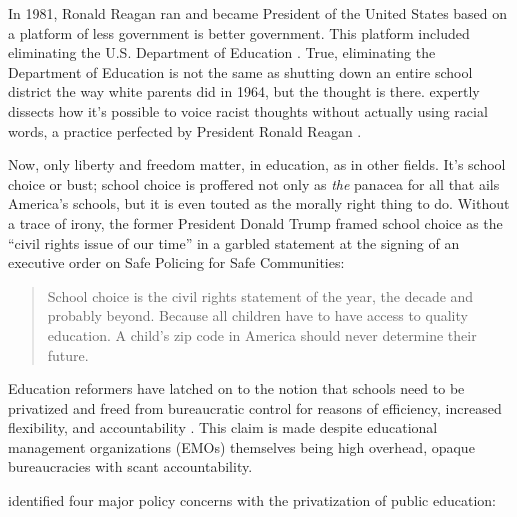 In 1981, Ronald Reagan ran and became President of the United States based on a platform of less government is better government. This platform included eliminating the U.S. Department of Education \parencite{gop1980}. True, eliminating the Department of Education is not the same as shutting down an entire school district the way white parents did in 1964, but the thought is there. \textcite{Haney-López2014} expertly dissects how it's possible to voice racist thoughts without actually using racial words, a practice perfected by President Ronald Reagan \parencite{Haney-López2014}.

Now, only liberty and freedom matter, in education, as in other fields. It's school choice or bust; school choice is proffered not only as \textit{the} panacea for all that ails America's schools, but it is even touted as the morally right thing to do. Without a  trace of irony, the former President Donald Trump framed school choice as the ``civil rights issue of our time'' in a garbled statement at the signing of an executive order on Safe Policing for Safe Communities:

\begin{quote}\OnehalfSpacing%
School choice is the civil rights statement of the year, the decade and probably beyond. Because all children have to have access to quality education. A child’s zip code in America should never determine their future.\\      
\end{quote} 

Education reformers have latched on to the notion that schools need to be privatized and freed from bureaucratic control for reasons of efficiency, increased flexibility, and accountability \parencite{Garcia2018}%
. This claim is made despite educational management organizations (EMOs) themselves being high overhead, opaque bureaucracies with scant accountability.

\citeauthor{Baker.Miron2015} identified four major policy concerns with the privatization of public education:

